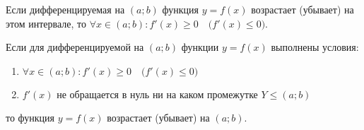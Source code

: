 \begin{theorem}
	Если дифференцируемая на $(a;b)$ функция $y=f(x)$ возрастает (убывает) на этом интервале, то $\forall x \in (a;b)\colon f'(x) \ge 0\quad \big( f'(x) \le 0 \big)$.
\end{theorem}
\begin{theorem}
	Если для дифференцируемой на $(a;b)$ функции $y=f(x)$ выполнены условия:
	\begin{enumerate}
		\item $\forall x \in (a;b)\colon f'(x) \ge 0\quad \big(f'(x) \le 0\big) $
		\item $f'(x)$ не обращается в нуль ни на каком промежутке $Y \le (a;b)$
	\end{enumerate}
	то функция $y=f(x)$ возрастает (убывает) на $(a;b)$.
\end{theorem}
\zerocounter
